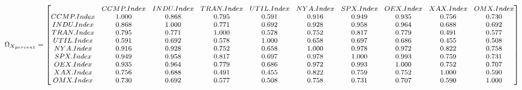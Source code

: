 \documentclass{article}
\begin{document}
\begin{equation*}
\begin{medsize}
\Omega_{X_{percent}} = %
\begin{bmatrix}{}
& CCMP.Index & INDU.Index & TRAN.Index & UTIL.Index & NYA.Index & SPX.Index & OEX.Index & XAX.Index & OMX.Index \\ 
  CCMP.Index & 1.000 & 0.868 & 0.795 & 0.591 & 0.916 & 0.949 & 0.935 & 0.756 & 0.730 \\ 
  INDU.Index & 0.868 & 1.000 & 0.771 & 0.692 & 0.928 & 0.958 & 0.964 & 0.688 & 0.692 \\ 
  TRAN.Index & 0.795 & 0.771 & 1.000 & 0.578 & 0.752 & 0.817 & 0.779 & 0.491 & 0.577 \\ 
  UTIL.Index & 0.591 & 0.692 & 0.578 & 1.000 & 0.658 & 0.697 & 0.686 & 0.455 & 0.508 \\ 
  NYA.Index & 0.916 & 0.928 & 0.752 & 0.658 & 1.000 & 0.978 & 0.972 & 0.822 & 0.758 \\ 
  SPX.Index & 0.949 & 0.958 & 0.817 & 0.697 & 0.978 & 1.000 & 0.993 & 0.759 & 0.731 \\ 
  OEX.Index & 0.935 & 0.964 & 0.779 & 0.686 & 0.972 & 0.993 & 1.000 & 0.752 & 0.707 \\ 
  XAX.Index & 0.756 & 0.688 & 0.491 & 0.455 & 0.822 & 0.759 & 0.752 & 1.000 & 0.590 \\ 
  OMX.Index & 0.730 & 0.692 & 0.577 & 0.508 & 0.758 & 0.731 & 0.707 & 0.590 & 1.000 \\ 
  \end{bmatrix}
\end{medsize}
\end{equation*}
\end{document}
